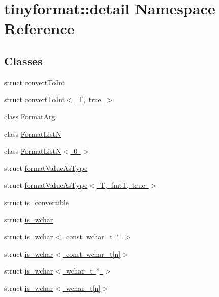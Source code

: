 \hypertarget{namespacetinyformat_1_1detail}{}\section{tinyformat\+:\+:detail Namespace Reference}
\label{namespacetinyformat_1_1detail}
\subsection*{Classes}
\begin{DoxyCompactItemize}
\item 
struct \mbox{\hyperlink{structtinyformat_1_1detail_1_1convert_to_int}{convert\+To\+Int}}
\item 
struct \mbox{\hyperlink{structtinyformat_1_1detail_1_1convert_to_int_3_01_t_00_01true_01_4}{convert\+To\+Int$<$ T, true $>$}}
\item 
class \mbox{\hyperlink{classtinyformat_1_1detail_1_1_format_arg}{Format\+Arg}}
\item 
class \mbox{\hyperlink{classtinyformat_1_1detail_1_1_format_list_n}{Format\+ListN}}
\item 
class \mbox{\hyperlink{classtinyformat_1_1detail_1_1_format_list_n_3_010_01_4}{Format\+List\+N$<$ 0 $>$}}
\item 
struct \mbox{\hyperlink{structtinyformat_1_1detail_1_1format_value_as_type}{format\+Value\+As\+Type}}
\item 
struct \mbox{\hyperlink{structtinyformat_1_1detail_1_1format_value_as_type_3_01_t_00_01fmt_t_00_01true_01_4}{format\+Value\+As\+Type$<$ T, fmt\+T, true $>$}}
\item 
struct \mbox{\hyperlink{structtinyformat_1_1detail_1_1is__convertible}{is\+\_\+convertible}}
\item 
struct \mbox{\hyperlink{structtinyformat_1_1detail_1_1is__wchar}{is\+\_\+wchar}}
\item 
struct \mbox{\hyperlink{structtinyformat_1_1detail_1_1is__wchar_3_01const_01wchar__t_01_5_01_4}{is\+\_\+wchar$<$ const wchar\+\_\+t $\ast$ $>$}}
\item 
struct \mbox{\hyperlink{structtinyformat_1_1detail_1_1is__wchar_3_01const_01wchar__t[n]_4}{is\+\_\+wchar$<$ const wchar\+\_\+t\mbox{[}n\mbox{]}$>$}}
\item 
struct \mbox{\hyperlink{structtinyformat_1_1detail_1_1is__wchar_3_01wchar__t_01_5_01_4}{is\+\_\+wchar$<$ wchar\+\_\+t $\ast$ $>$}}
\item 
struct \mbox{\hyperlink{structtinyformat_1_1detail_1_1is__wchar_3_01wchar__t[n]_4}{is\+\_\+wchar$<$ wchar\+\_\+t\mbox{[}n\mbox{]}$>$}}
\end{DoxyCompactItemize}
